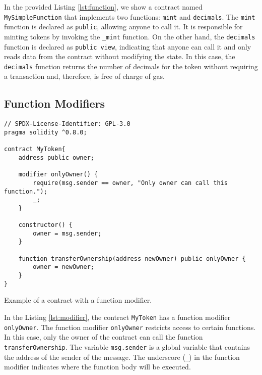 In the provided Listing \ref{lst:function}, we show a contract named \texttt{MySimpleFunction} that implements two functions: \texttt{mint} and \texttt{decimals}.
The \texttt{mint} function is declared as \texttt{public}, allowing anyone to call it. It is responsible for minting tokens by invoking the \texttt{\_mint} function.
On the other hand, the \texttt{decimals} function is declared as \texttt{public view}, indicating that anyone can call it and only reads data from the contract without
modifying the state. In this case, the \texttt{decimals} function returns the number of decimals for the token without requiring a transaction and, therefore, is free of
charge of gas.


\subsection{Function Modifiers}

\begin{listing}[!ht]
    \begin{verbatim}
// SPDX-License-Identifier: GPL-3.0
pragma solidity ^0.8.0;

contract MyToken{
    address public owner;
    
    modifier onlyOwner() {
        require(msg.sender == owner, "Only owner can call this function.");
        _;
    }

    constructor() {
        owner = msg.sender;
    }

    function transferOwnership(address newOwner) public onlyOwner {
        owner = newOwner;
    }
}
    \end{verbatim}
    \caption{Example of a contract with a function modifier.}
    \label{lst:modifier}
\end{listing}


In the Listing \ref{lst:modifier}, the contract \texttt{MyToken} has a function modifier \texttt{onlyOwner}. The function modifier \texttt{onlyOwner} restricts
access to certain functions. In this case, only the owner of the contract can call the function \texttt{transferOwnership}.
The variable \texttt{msg.sender} is a global variable that contains the address of the sender of the message. The underscore (\texttt{\_}) in the function modifier
indicates where the function body will be executed.



